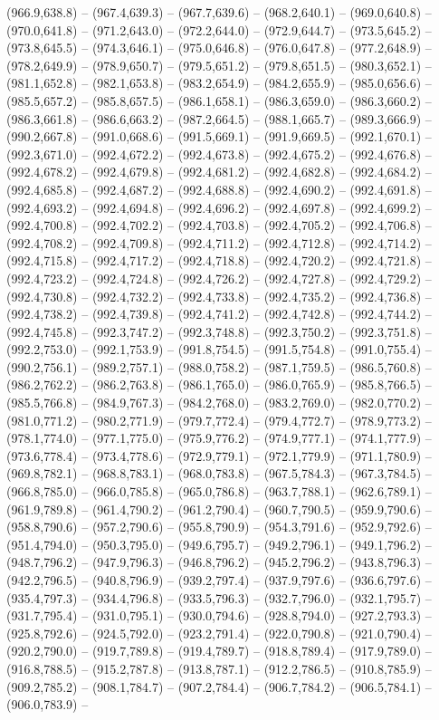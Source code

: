 (966.9,638.8) -- (967.4,639.3) -- (967.7,639.6) -- (968.2,640.1) -- (969.0,640.8) -- (970.0,641.8) -- (971.2,643.0) -- (972.2,644.0) -- (972.9,644.7) -- (973.5,645.2) -- (973.8,645.5) -- (974.3,646.1) -- (975.0,646.8) -- (976.0,647.8) -- (977.2,648.9) -- (978.2,649.9) -- (978.9,650.7) -- (979.5,651.2) -- (979.8,651.5) -- (980.3,652.1) -- (981.1,652.8) -- (982.1,653.8) -- (983.2,654.9) -- (984.2,655.9) -- (985.0,656.6) -- (985.5,657.2) -- (985.8,657.5) -- (986.1,658.1) -- (986.3,659.0) -- (986.3,660.2) -- (986.3,661.8) -- (986.6,663.2) -- (987.2,664.5) -- (988.1,665.7) -- (989.3,666.9) -- (990.2,667.8) -- (991.0,668.6) -- (991.5,669.1) -- (991.9,669.5) -- (992.1,670.1) -- (992.3,671.0) -- (992.4,672.2) -- (992.4,673.8) -- (992.4,675.2) -- (992.4,676.8) -- (992.4,678.2) -- (992.4,679.8) -- (992.4,681.2) -- (992.4,682.8) -- (992.4,684.2) -- (992.4,685.8) -- (992.4,687.2) -- (992.4,688.8) -- (992.4,690.2) -- (992.4,691.8) -- (992.4,693.2) -- (992.4,694.8) -- (992.4,696.2) -- (992.4,697.8) -- (992.4,699.2) -- (992.4,700.8) -- (992.4,702.2) -- (992.4,703.8) -- (992.4,705.2) -- (992.4,706.8) -- (992.4,708.2) -- (992.4,709.8) -- (992.4,711.2) -- (992.4,712.8) -- (992.4,714.2) -- (992.4,715.8) -- (992.4,717.2) -- (992.4,718.8) -- (992.4,720.2) -- (992.4,721.8) -- (992.4,723.2) -- (992.4,724.8) -- (992.4,726.2) -- (992.4,727.8) -- (992.4,729.2) -- (992.4,730.8) -- (992.4,732.2) -- (992.4,733.8) -- (992.4,735.2) -- (992.4,736.8) -- (992.4,738.2) -- (992.4,739.8) -- (992.4,741.2) -- (992.4,742.8) -- (992.4,744.2) -- (992.4,745.8) -- (992.3,747.2) -- (992.3,748.8) -- (992.3,750.2) -- (992.3,751.8) -- (992.2,753.0) -- (992.1,753.9) -- (991.8,754.5) -- (991.5,754.8) -- (991.0,755.4) -- (990.2,756.1) -- (989.2,757.1) -- (988.0,758.2) -- (987.1,759.5) -- (986.5,760.8) -- (986.2,762.2) -- (986.2,763.8) -- (986.1,765.0) -- (986.0,765.9) -- (985.8,766.5) -- (985.5,766.8) -- (984.9,767.3) -- (984.2,768.0) -- (983.2,769.0) -- (982.0,770.2) -- (981.0,771.2) -- (980.2,771.9) -- (979.7,772.4) -- (979.4,772.7) -- (978.9,773.2) -- (978.1,774.0) -- (977.1,775.0) -- (975.9,776.2) -- (974.9,777.1) -- (974.1,777.9) -- (973.6,778.4) -- (973.4,778.6) -- (972.9,779.1) -- (972.1,779.9) -- (971.1,780.9) -- (969.8,782.1) -- (968.8,783.1) -- (968.0,783.8) -- (967.5,784.3) -- (967.3,784.5) -- (966.8,785.0) -- (966.0,785.8) -- (965.0,786.8) -- (963.7,788.1) -- (962.6,789.1) -- (961.9,789.8) -- (961.4,790.2) -- (961.2,790.4) -- (960.7,790.5) -- (959.9,790.6) -- (958.8,790.6) -- (957.2,790.6) -- (955.8,790.9) -- (954.3,791.6) -- (952.9,792.6) -- (951.4,794.0) -- (950.3,795.0) -- (949.6,795.7) -- (949.2,796.1) -- (949.1,796.2) -- (948.7,796.2) -- (947.9,796.3) -- (946.8,796.2) -- (945.2,796.2) -- (943.8,796.3) -- (942.2,796.5) -- (940.8,796.9) -- (939.2,797.4) -- (937.9,797.6) -- (936.6,797.6) -- (935.4,797.3) -- (934.4,796.8) -- (933.5,796.3) -- (932.7,796.0) -- (932.1,795.7) -- (931.7,795.4) -- (931.0,795.1) -- (930.0,794.6) -- (928.8,794.0) -- (927.2,793.3) -- (925.8,792.6) -- (924.5,792.0) -- (923.2,791.4) -- (922.0,790.8) -- (921.0,790.4) -- (920.2,790.0) -- (919.7,789.8) -- (919.4,789.7) -- (918.8,789.4) -- (917.9,789.0) -- (916.8,788.5) -- (915.2,787.8) -- (913.8,787.1) -- (912.2,786.5) -- (910.8,785.9) -- (909.2,785.2) -- (908.1,784.7) -- (907.2,784.4) -- (906.7,784.2) -- (906.5,784.1) -- (906.0,783.9) -- 
